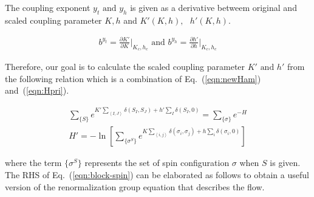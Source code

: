 \documentclass[%
 reprint,
 amsmath,amssymb,
 aps,
]{revtex4-2}
\begin{document}
The coupling exponent $y_t \text{ and } y_h$ is given as a derivative betweem original and 
scaled coupling parameter $K, h$ and $K'(K,h), \text{ } h'(K,h)$.

\begin{eqnarray}
b^{y_{t}} = \frac{\partial K'}{\partial K}\bigg|_{K_c,h_c} \text{ and } 
b^{y_{h}} = \frac{\partial h'}{\partial h}\bigg|_{K_c,h_c} \label{eqn:exp}
\end{eqnarray}

Therefore, our goal is to calculate the scaled coupling parameter $K' \text{ and } h'$ from
the following relation which is a combination of Eq.~(\ref{eqn:newHam}) and~(\ref{eqn:Hpri}).

\begin{gather}
\sum_{\{S\}}e^{K'\sum_{\left<I,J\right>}\delta(S_{I}, S_{J}) +h'\sum_{I}\delta(S_{I},0)} = 
\sum_{\{\sigma\}}e^{-H} \\
H' = -\ln\left[\sum_{\{\sigma^{S}\}} e^{K\sum_{\left<i,j\right>}\delta(\sigma_{i}, \sigma_{j}) 
+h\sum_{i}\delta(\sigma_{i},0)}\right] \label{eqn:block-spin}
\end{gather}

where the term $\{\sigma^{S}\}$ represents the set of spin configuration $\sigma$ when 
$S$ is given. \\

The RHS of Eq.~(\ref{eqn:block-spin}) can be elaborated as follows to obtain a useful version of the 
renormalization group equation that describes the flow.
\end{document}

